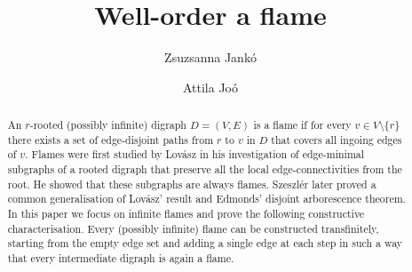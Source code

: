 \documentclass[12pt,a4paper]{amsart}
\title{Well-order a flame}
\author{Zsuzsanna Jank\'{o}}
\author{Attila Jo\'{o}}
\theoremstyle{plain}
\theoremstyle{definition}
\begin{document}
\begin{abstract}
An $r$-rooted (possibly infinite) digraph $ D=(V,E) $ is a flame if for every $ v\in V\setminus \{ r \} $ there exists a set of edge-disjoint paths from 
$r$ to $v$ in $D$ that covers all ingoing edges of $ v $. Flames were first studied by Lovász in his investigation of edge-minimal subgraphs of a 
rooted digraph that preserve all the local edge-connectivities from the root. He showed that these subgraphs are always flames.   Szeszlér later 
proved a common generalisation of Lovász' result and 
Edmonds’ disjoint arborescence theorem.  In this paper we focus on infinite flames and prove the following constructive characterisation. Every 
(possibly infinite) flame can be constructed transfinitely, starting from the empty edge set and adding a single edge at each step in such a way that 
every intermediate digraph is again a flame.  
\end{abstract}
\maketitle
\end{document}

